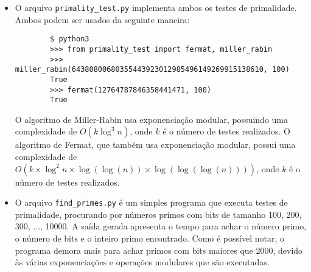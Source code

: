 \documentclass{article}
\begin{document}
\begin{itemize}
    \item O arquivo \texttt{primality\_test.py} implementa ambos os testes de
    primalidade. Ambos podem ser usados da seguinte maneira:
    \begin{verbatim}
        $ python3
        >>> from primality_test import fermat, miller_rabin
        >>> miller_rabin(64380800680355443923012985496149269915138610, 100)
        True
        >>> fermat(12764787846358441471, 100)
        True
    \end{verbatim}

    O algoritmo de Miller-Rabin usa exponenciação modular, possuindo uma
    complexidade de $O(k\log^{3}n)$, onde $k$ é o número de testes realizados.
    O algoritmo de Fermat, que também usa exponenciação modular, possui uma
    complexidade de
    $O(k\times\log^{2}n\times\log(\log(n))\times\log(\log(\log(n))))$, onde $k$
    é o número de testes realizados.
    
    \item O arquivo \texttt{find\_primes.py} é um simples programa que executa
    testes de primalidade, procurando por números primos com bits de tamanho
    100, 200, 300, ..., 10000. A saída gerada apresenta o tempo para achar o
    número primo, o número de bits e o inteiro primo encontrado. Como é
    possível notar, o programa demora mais para achar primos com bits maiores
    que 2000, devido às várias exponenciações e operações modulares que são
    executadas.
\end{itemize}
\end{document}
